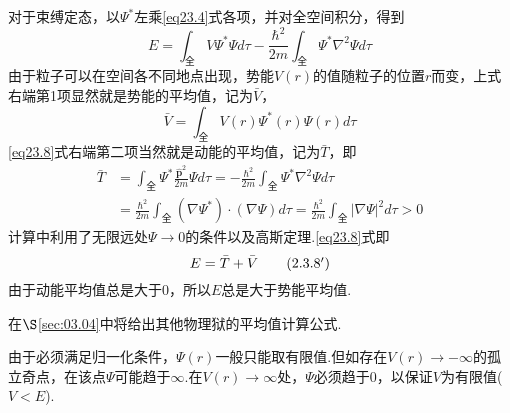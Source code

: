 对于束缚定态，以$\varPsi^{*}$左乘\eqref{eq23.4}式各项，并对全空间积分，得到
\begin{equation}\label{eq23.8}
	E=\int_{\text{全}}V\varPsi^{*}\varPsi d\tau-\frac{\hbar^{2}}{2m}\int_{\text{全}}\varPsi^{*}\nabla^{2}\varPsi d\tau
\end{equation}
由于粒子可以在空间各不同地点出现，势能$V(r)$的值随粒子的位置$r$而变，上式右端第1项显然就是势能的平均值，记为$\bar{V}$，
\begin{equation}\label{eq23.9}
	\bar{V}=\int_{\text{全}}V(r)\varPsi^{*}(r)\varPsi(r)d\tau
\end{equation}
\eqref{eq23.8}式右端第二项当然就是动能的平均值，记为$\bar{T}$，即
\setlength{\mathindent}{4em}
\begin{equation}\label{eq23.10}
	\begin{aligned} 
		\bar{T} 
		&=\int_{\text{全}}\varPsi^{*}\frac{\hat{\boldsymbol{p}}^{2}}{2m}\varPsi d\tau
		 =-\frac{\hbar^{2}}{2m}\int_{\text{全}}\varPsi^{*}\nabla^{2}\varPsi d\tau	\\
		&=\frac{\hbar^{2}}{2m}\int_{\text{全}}(\nabla\varPsi^{*})\cdot(\nabla\varPsi)d\tau
		 =\frac{\hbar^{2}}{2m}\int_{\text{全}}|\nabla\varPsi|^{2} d\tau >0
	\end{aligned}
\end{equation}\eqshort
计算中利用了无限远处$\varPsi\rightarrow 0$的条件以及高斯定理.\eqref{eq23.8}式即
\begin{equation*}\label{eq23.8'}
	E=\bar{T}+\bar{V} \tag{$2.3.8^{\prime}$}
\end{equation*}\eqllong
由于动能平均值总是大于0，所以$E$总是大于势能平均值.

在$\S$\ref{sec:03.04}中将给出其他物理狱的平均值计算公式.

由于必须满足归一化条件，$\varPsi(r)$一般只能取有限值.但如存在$V(r)\rightarrow-\infty$的孤立奇点，在该点$\varPsi$可能趋于$\infty$.在$V(r)\rightarrow \infty$处，$\varPsi$必须趋于0，以保证$V$为有限值($V<E$).


